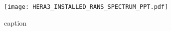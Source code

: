 
\begin{figure}[htbp]
  \centering
  \texttt{[image: HERA3\_INSTALLED\_RANS\_SPECTRUM\_PPT.pdf]}
  \caption{caption}
  \label{fig:HERA3_INSTALLED_RANS_SPECTRUM_PPT}
\end{figure}